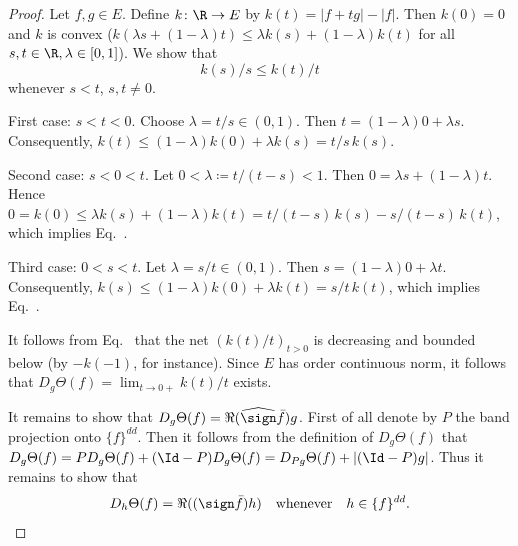 \begin{proof}
Let $f, g \in E$. Define $k \colon \R \to E$ by $k(t) = |f+tg| - |f|$.
Then $k(0) = 0$ and $k$ is convex (\ie $k(\lambda s + (1-\lambda)t) \leq \lambda k(s) + (1-\lambda)k(t)$ for all $s, t \in \R, \lambda \in [0,1]$).
We show that
\begin{equation}\label{eq:c2-5.7}
k(s)/s \leq k(t)/t
\end{equation}
whenever $s < t$, $s,t \neq 0$.

First case: $s < t < 0$.
Choose $\lambda = t/s \in (0,1)$. 
Then $t = (1-\lambda)0 + \lambda s$. 
Consequently, $k(t) \leq (1-\lambda)k(0) + \lambda k(s) = t/s \, k(s)$.

Second case: $s < 0 < t$.
Let $0 < \lambda \coloneqq t/(t-s) < 1$. 
Then $0 = \lambda s + (1-\lambda)t$. 
Hence $0 = k(0) \leq \lambda k(s) + (1-\lambda)k(t) = t/(t-s) \, k(s) - s/(t-s) \, k(t)$, which implies Eq.~.

Third case: $0 < s < t$.
Let $\lambda = s/t \in (0,1)$. Then $s = (1-\lambda)0 + \lambda t$. Consequently, $k(s) \leq (1-\lambda)k(0) + \lambda k(t) = s/t \, k(t)$, which implies Eq.~.

It follows from Eq.~ that the net $(k(t)/t)_{t>0}$ is decreasing and bounded below (by $-k(-1)$, for instance). Since $E$ has order continuous norm, it follows that $D_{g}\Theta(f) = \lim_{t \to 0+} k(t)/t$ exists.

It remains to show that $D_{g}\Theta(f) = \Re(\widehat{\sign}  \bar{f})g$.
First of all denote by $P$ the band projection onto $\{f\}^{dd}$. Then it
follows from the definition of\/ $D_{g}\Theta(f)$ that $D_{g}\Theta(f) = PD_{g}\Theta(f) + (\Id-P)D_{g}\Theta(f) = D_{Pg}\Theta(f) + |(\Id-P)g|$. 
Thus it remains to show that
\begin{equation}\label{eq:c2-5.8}
D_{h}\Theta(f) = \Re((\sign  \bar{f})h) \quad \text{whenever} \quad h \in \{f\}^{dd}.
\end{equation}


\end{proof}

